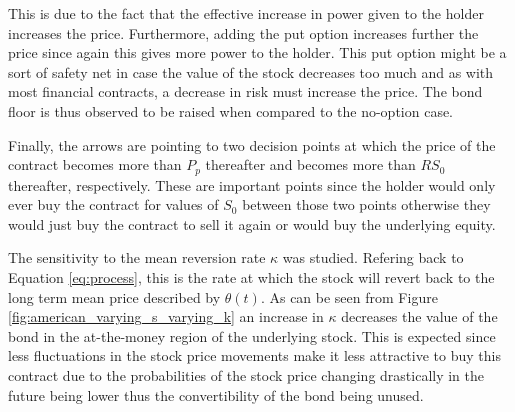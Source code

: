 \documentclass{article}
\begin{document}
This is due to the fact that the effective increase in power given to the holder increases the price.
Furthermore, adding the put option increases further the price since again this gives more power to the holder.
This put option might be a sort of safety net in case the value of the stock decreases too much and as with most financial contracts, a decrease in risk must increase the price.
The bond floor is thus observed to be raised when compared to the no-option case.
\\
\par Finally, the arrows are pointing to two decision points at which the price of the contract becomes more than $P_p$ thereafter and becomes more than $RS_0$ thereafter, respectively.
These are important points since the holder would only ever buy the contract for values of $S_0$ between those two points otherwise they would just buy the contract to sell it again or would buy the underlying equity.
\\
\par The sensitivity to the mean reversion rate \cite{CHOUDHRY2001873} $\kappa$ was studied.
Refering back to Equation \ref{eq:process}, this is the rate at which the stock will revert back to the long term mean price described by $\theta(t)$.
As can be seen from Figure \ref{fig:american_varying_s_varying_k} an increase in $\kappa$ decreases the value of the bond in the at-the-money region of the underlying stock.
This is expected since less fluctuations in the stock price movements make it less attractive to buy this contract due to the probabilities of the stock price changing drastically in the future being lower thus the convertibility of the bond being unused.
\end{document}
